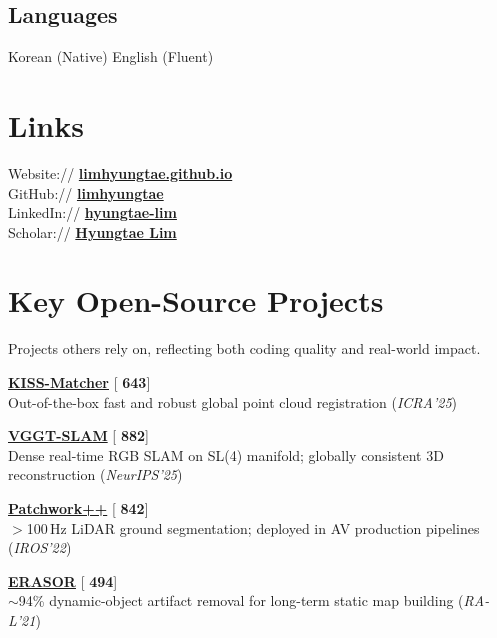 \documentclass[]{deedy-resume-openfont}
\newcommand{\githubstars}[1]{[{\faGithubSquare}\,\ding{72}\,\textbf{#1}]}
\begin{document}
\begin{minipage}[t]{0.33\textwidth}
\subsection{Languages}
Korean (Native) \textbullet{} English (Fluent)
\sectionsep

\section{Links}
Website:// \href{https://limhyungtae.github.io/hyungtae-lim/}{\bf limhyungtae.github.io} \\
GitHub:// \href{https://github.com/limhyungtae}{\bf limhyungtae} \\
LinkedIn:// \href{https://www.linkedin.com/in/hyungtae-lim}{\bf hyungtae-lim} \\
Scholar:// \href{https://scholar.google.com/citations?user=S1A3nbIAAAAJ}{\bf Hyungtae Lim}
\sectionsep

\section{Key Open-Source Projects}
\small{Projects others rely on, reflecting both coding quality and real-world impact.}
\vspace{0.3cm}
\begin{tightemize}
\item \href{https://github.com/MIT-SPARK/KISS-Matcher}{\textbf{KISS-Matcher}} \githubstars{643} \\
Out-of-the-box fast and robust global point cloud registration (\textit{ICRA'25})
\item \href{https://github.com/MIT-SPARK/VGGT-SLAM}{\textbf{VGGT-SLAM}} \githubstars{882} \\
Dense real-time RGB SLAM on SL(4) manifold; globally consistent 3D reconstruction (\textit{NeurIPS'25})
\item \href{https://github.com/url-kaist/patchwork-plusplus}{\textbf{Patchwork++}} \githubstars{842} \\
$>$100\,Hz LiDAR ground segmentation; deployed in AV production pipelines (\textit{IROS'22})
\item \href{https://github.com/LimHyungTae/ERASOR}{\textbf{ERASOR}} \githubstars{494} \\
${\sim}$94\% dynamic-object artifact removal for long-term static map building (\textit{RA-L'21})
\end{tightemize}
\sectionsep


\end{minipage}
\end{document}
